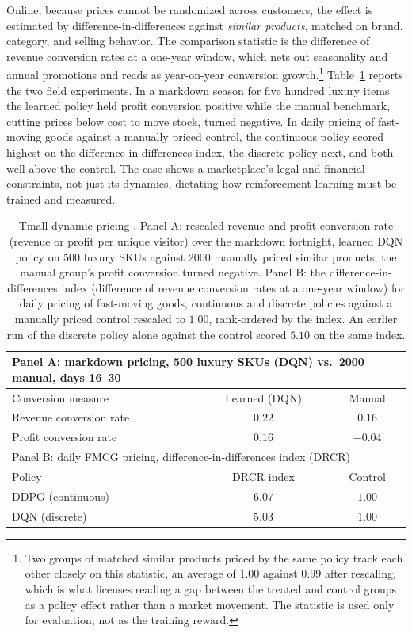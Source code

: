 Online, because prices cannot be randomized across customers, the effect is estimated by difference-in-differences against \emph{similar products}, matched on brand, category, and selling behavior. The comparison statistic is the difference of revenue conversion rates at a one-year window, which nets out seasonality and annual promotions and reads as year-on-year conversion growth.\footnote{Two groups of matched similar products priced by the same policy track each other closely on this statistic, an average of $1.00$ against $0.99$ after rescaling, which is what licenses reading a gap between the treated and control groups as a policy effect rather than a market movement. The statistic is used only for evaluation, not as the training reward.} Table~\ref{tab:tmall_results} reports the two field experiments. In a markdown season for five hundred luxury items the learned policy held profit conversion positive while the manual benchmark, cutting prices below cost to move stock, turned negative. In daily pricing of fast-moving goods against a manually priced control, the continuous policy scored highest on the difference-in-differences index, the discrete policy next, and both well above the control. The case shows a marketplace's legal and financial constraints, not just its dynamics, dictating how reinforcement learning must be trained and measured.

\begin{table}[t]
\centering
\small
\begin{tabular}{lcc}
\toprule
\multicolumn{3}{l}{Panel A: markdown pricing, 500 luxury SKUs (DQN) vs.\ 2000 manual, days 16--30} \\
\midrule
Conversion measure & Learned (DQN) & Manual \\
\midrule
Revenue conversion rate & $0.22$ & $0.16$ \\
Profit conversion rate & $0.16$ & $-0.04$ \\
\midrule
\multicolumn{3}{l}{Panel B: daily FMCG pricing, difference-in-differences index (DRCR)} \\
\midrule
Policy & DRCR index & Control \\
\midrule
DDPG (continuous) & $6.07$ & $1.00$ \\
DQN (discrete) & $5.03$ & $1.00$ \\
\bottomrule
\end{tabular}
\caption{Tmall dynamic pricing \citep{Liu2019}. Panel A: rescaled revenue and profit conversion rate (revenue or profit per unique visitor) over the markdown fortnight, learned DQN policy on 500 luxury SKUs against 2000 manually priced similar products; the manual group's profit conversion turned negative. Panel B: the difference-in-differences index (difference of revenue conversion rates at a one-year window) for daily pricing of fast-moving goods, continuous and discrete policies against a manually priced control rescaled to $1.00$, rank-ordered by the index. An earlier run of the discrete policy alone against the control scored $5.10$ on the same index.}
\label{tab:tmall_results}
\end{table}

